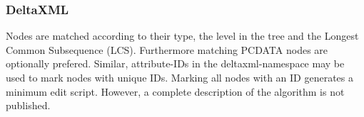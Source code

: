 


\subsubsection{DeltaXML\cite{DELTAXML}}
Nodes are matched according to their type, the level in the tree and the Longest Common Subsequence (LCS). Furthermore matching PCDATA nodes are optionally prefered. Similar, attribute-IDs in the deltaxml-namespace may be used to mark nodes with unique IDs. Marking all nodes with an ID generates a minimum edit script. However, a complete description of the algorithm is not published.

